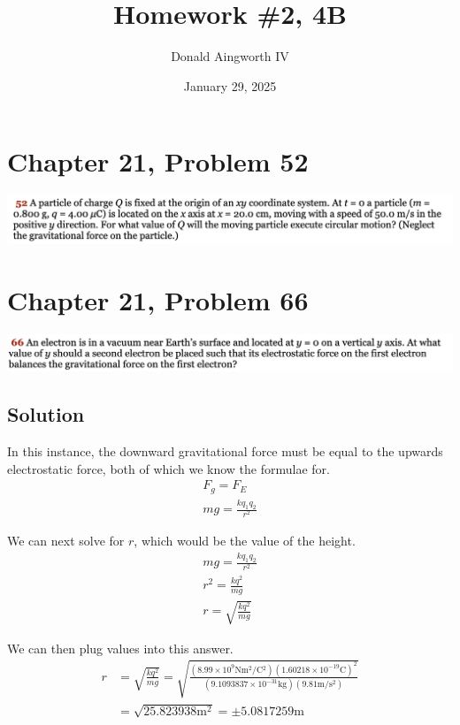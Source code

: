 \documentclass[12pt]{article}
\title{Homework \#2, 4B}
\author{Donald Aingworth IV}
\date{January 29, 2025}
\begin{document}

\maketitle

\pagebreak
\section*{Chapter 21, Problem 52}
\includegraphics[width=\textwidth]{picture_1.png}


\pagebreak
\section*{Chapter 21, Problem 66}
\includegraphics[width=\textwidth]{picture_2.png}

\subsection*{Solution}
In this instance, the downward gravitational force must be equal to the upwards electrostatic force, both of which we know the formulae for.
\begin{gather*}
    F_g = F_E\\
    mg = \frac{kq_1 q_2}{r^2}
\end{gather*}

We can next solve for $r$, which would be the value of the height.
\begin{gather*}
    mg = \frac{kq_1 q_2}{r^2}\\
    r^2 = \frac{k q^2}{mg}\\
    r = \sqrt{\frac{k q^2}{mg}}
\end{gather*}

We can then plug values into this answer.
\begin{align*}
    r   &=  \sqrt{\frac{k q^2}{mg}}
        =   \sqrt{\frac{(8.99 \times 10^{9} \unit{\newton\meter^2/\coulomb^2}) (1.60218 \times 10^{-19} \unit{\coulomb})^2}{(9.1093837 \times 10^{-31} \unit{\kilo\gram})(9.81 \unit{\meter/\second^2})}}\\
        &=  \sqrt{25.823938 \unit{\meter^2}}
        =   \pm 5.0817259 \unit{\meter}
\end{align*}
\end{document}
